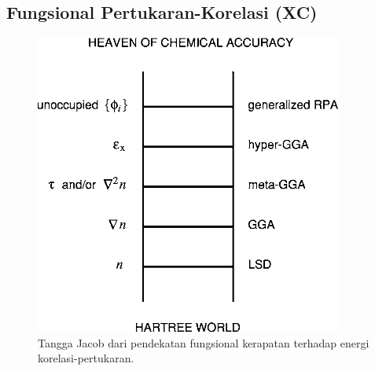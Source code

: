 \subsection{Fungsional Pertukaran-Korelasi (XC)}

\begin{figure}[h!]
    \centering
    \includegraphics[width=0.9\textwidth]{gambar/jacob_ladder}
    \caption{Tangga Jacob dari pendekatan fungsional kerapatan terhadap energi korelasi-pertukaran. \citep{perdew2005}}
    \label{fig:xc_jacob_ladder}
\end{figure}

